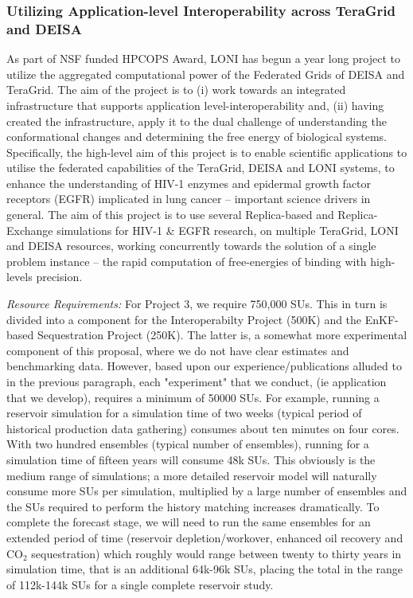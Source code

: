 \documentclass[a4paper,10pt]{article}
\begin{document}
\subsubsection*{Utilizing Application-level Interoperability across TeraGrid and DEISA}
As part of NSF funded HPCOPS Award, LONI has begun a year long project to utilize the aggregated computational power of the Federated Grids of DEISA and TeraGrid. The aim of the project is to (i) work towards an integrated infrastructure that supports application level-interoperability and, (ii) having created the infrastructure, apply it to the dual challenge of understanding the conformational changes and determining the free energy of biological systems. Specifically, the high-level aim of this project is to enable scientific applications to utilise the federated capabilities of the TeraGrid, DEISA and LONI systems, to enhance the understanding of HIV-1 enzymes and epidermal growth factor receptors (EGFR) implicated in lung cancer -- important science drivers in general. The aim of this project is to use several Replica-based and Replica-Exchange simulations for HIV-1 \& EGFR research, on multiple TeraGrid, LONI and DEISA resources, working concurrently towards the solution of a single problem instance -- the rapid computation of free-energies of binding with high-levels precision.

{\it Resource Requirements:} For Project 3, we require 750,000 SUs. This in turn is divided into a component for the Interoperabilty Project (500K) and the EnKF-based Sequestration Project (250K). The latter is, a somewhat more experimental component of this proposal, where we do not have clear estimates and benchmarking data. However, based upon our experience/publications alluded to in the previous paragraph, each "experiment" that we conduct, (ie application that we develop), requires a minimum of 50000 SUs. For example, running a reservoir simulation for a simulation time of two weeks (typical period of historical production data gathering) consumes about ten minutes on four cores.  With two hundred ensembles (typical number of ensembles), running for a simulation time of fifteen years will consume 48k SUs. This obviously is the medium range of simulations; a more detailed reservoir model will naturally consume more SUs per simulation, multiplied by a large number of ensembles and the SUs required to perform the history matching increases dramatically. To complete the forecast stage, we will need to run the same ensembles for an extended period of time (reservoir depletion/workover, enhanced oil recovery and CO$_2$ sequestration) which roughly would range between twenty to thirty years in simulation time, that is an additional 64k-96k SUs, placing the total in the range of 112k-144k SUs for a single complete reservoir study.
\end{document}
